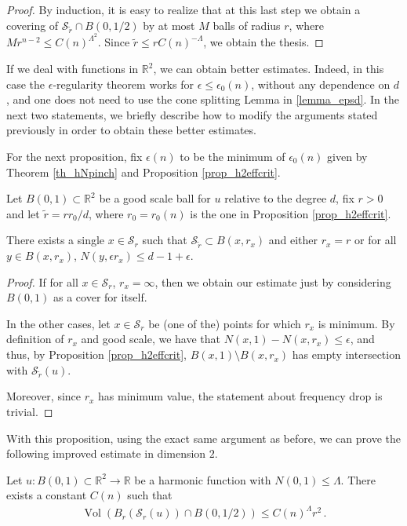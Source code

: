\documentclass[11pt]{article}
\begin{document}
\begin{proof}
By induction, it is easy to realize that at this last step we obtain a covering of ${\mathcal{S}}_{\tilde r}\cap B(0,1/2)$ by at most $M$ balls of radius $r$, where $M r^{n-2}\leq C(n)^{\Lambda^2}$. Since ${\tilde r}\leq r C(n)^{-\Lambda}$, we obtain the thesis.

\end{proof}

\begin{remark}
 If we deal with functions in ${\mathbb{R}}^2$, we can obtain better estimates. Indeed, in this case the $\epsilon$-regularity theorem works for $\epsilon\leq \epsilon_0(n)$, without any dependence on $d$, and one does not need to use the cone splitting Lemma in \ref{lemma_epsd}. In the next two statements, we briefly describe how to modify the arguments stated previously in order to obtain these better estimates.
\end{remark}

For the next proposition, fix $\epsilon(n)$ to be the minimum of $\epsilon_0(n)$ given by Theorem \ref{th_hNpinch} and Proposition \ref{prop_h2effcrit}.
\begin{proposition}
 Let $B(0,1)\subset {\mathbb{R}}^2$ be a good scale ball for $u$ relative to the degree $d$, fix $r>0$ and let $\tilde r = r r_0/d$, where $r_0=r_0(n)$ is the one in Proposition \ref{prop_h2effcrit}.
 
 There exists a single $x\in {\mathcal{S}}_r$ such that ${\mathcal{S}}_{\tilde r}\subset B(x,r_x)$ and either $r_x=r$ or for all $y\in B(x,r_x)$, $N(y,\epsilon r_x)\leq d-1+\epsilon$.
\end{proposition}
\begin{proof}
If for all $x\in {\mathcal{S}}_r$, $r_x=\infty$, then we obtain our estimate just by considering $B(0,1)$ as a cover for itself.  

In the other cases, let $x\in {\mathcal{S}}_r$ be (one of the) points for which $r_x$ is minimum. By definition of $r_x$ and good scale, we have that $N(x,1)-N(x,r_x)\leq \epsilon$, and thus, by Proposition \ref{prop_h2effcrit}, $B(x,1)\setminus B(x,r_x)$ has empty intersection with ${\mathcal{S}}_{\tilde r}(u)$.
 
 Moreover, since $r_x$ has minimum value, the statement about frequency drop is trivial.
\end{proof}

With this proposition, using the exact same argument as before, we can prove the following improved estimate in dimension $2$.

\begin{theorem}
 Let $u:B(0,1)\subset {\mathbb{R}}^2\to {\mathbb{R}}$ be a harmonic function with $N(0,1)\leq \Lambda$. There exists a constant $C(n)$ such that
 \begin{gather}
  {\operatorname{Vol}}{\left({B_r{\left({{\mathcal{S}}_r(u)}\right)} \cap B(0,1/2)}\right)}\leq C(n)^{\Lambda} r^2\, .
 \end{gather}
\end{theorem}
\end{document}
